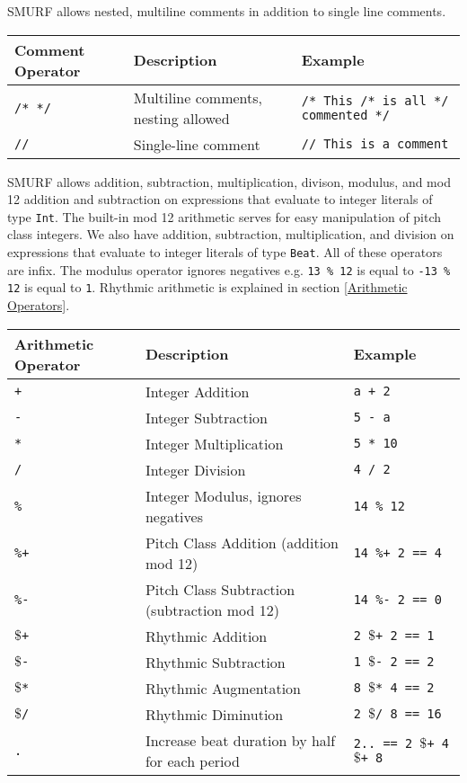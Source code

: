 SMURF allows nested, multiline comments in addition to single line comments.
\begin{table} [H]
\centering
\begin{tabularx}{\textwidth}{lXl}
\hline\hline
Comment Operator & Description & Example \\
\hline\hline
  \texttt{/* */} & Multiline comments, nesting allowed & \texttt{/* This /* is all */ commented */} \\ \hline
  \texttt{//} & Single-line comment & \texttt{// This is a comment} \\ \hline
\end{tabularx}
\end{table}

SMURF allows addition, subtraction, multiplication, divison, modulus, and mod 12 addition and subtraction on expressions that evaluate to integer literals of type \texttt{Int}. The built-in mod 12 arithmetic serves for easy 
manipulation of pitch class integers. We also have addition, subtraction,
multiplication, and division on expressions that evaluate to integer literals of type \texttt{Beat}. All of these operators are infix.
The modulus operator ignores negatives e.g. \texttt{13 \% 12} is equal to \texttt{-13 \% 12} is equal to \texttt{1}. Rhythmic arithmetic is explained
in section \ref{Arithmetic Operators}.
\begin{table} [H]
\centering
\begin{tabularx}{\textwidth}{lXX}
\hline\hline
Arithmetic Operator & Description & Example \\
\hline\hline
  \texttt{+} & Integer Addition  & \texttt{a + 2} \\ \hline
  \texttt{-} & Integer Subtraction  & \texttt{5 - a} \\ \hline 
  \texttt{*} & Integer Multiplication  & \texttt{5 * 10} \\ \hline 
  \texttt{/} & Integer Division  & \texttt{4 / 2} \\ \hline 
  \texttt{\%} & Integer Modulus, ignores negatives  & \texttt{14 \% 12} \\ \hline
  \texttt{\%+} & Pitch Class Addition (addition mod 12)  & \texttt{14 \%+ 2 == 4 }\\ \hline
  \texttt{\%-} & Pitch Class Subtraction (subtraction mod 12)  & \texttt{14 \%- 2 == 0 } \\ \hline
  \texttt{$\$$+} & Rhythmic Addition & \texttt{2 $\$$+ 2 == 1} \\ \hline
  \texttt{$\$$-} & Rhythmic Subtraction & \texttt{1 $\$$- 2 == 2}  \\ \hline
  \texttt{$\$$*} & Rhythmic Augmentation & \texttt{8 $\$$* 4 == 2}  \\ \hline
  \texttt{$\$$/} & Rhythmic Diminution & \texttt{2 $\$$/ 8 == 16}  \\ \hline
  \texttt{.} & Increase beat duration by half for each period & \texttt{2.. == 2 $\$$+ 4 $\$$+ 8}  \\ \hline
\end{tabularx}
\end{table}

